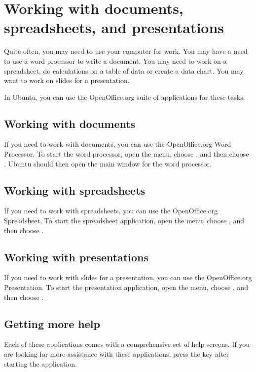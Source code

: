 \section{Working with documents, spreadsheets, and presentations}

Quite often, you may need to use your computer for work. You may have a need 
to use a word processor to write a document. You may need to work on a 
spreadsheet, do calculations on a table of data or create a data chart. You 
may want to work on slides for a presentation.

In Ubuntu, you can use the OpenOffice.org suite of applications for these 
tasks.

\subsection{Working with documents}

If you need to work with documents, you can use the OpenOffice.org Word 
Processor. To start the word processor, open the 
menu, choose , and then choose . Ubuntu should then open the main window for the word processor.

\subsection{Working with spreadsheets}

If you need to work with spreadsheets, you can use the OpenOffice.org 
Spreadsheet. To start the spreadsheet application, open the 
 menu, choose , and then choose
.

\subsection{Working with presentations}

If you need to work with slides for a presentation, you can use the 
OpenOffice.org Presentation. To start the presentation application, open the 
 menu, choose , and then choose
.

\subsection{Getting more help}

Each of these applications comes with a comprehensive set of help screens.
If you are looking for more assistance with these applications, press the
 key after starting the application.

